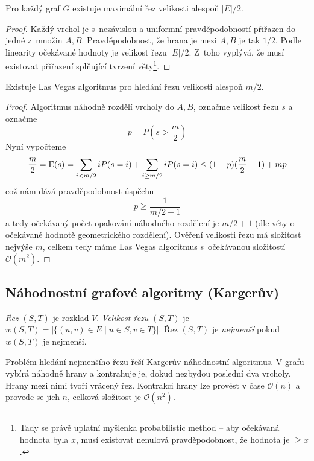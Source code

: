 \begin{theorem}
    Pro každý graf $G$ existuje maximální řez velikosti alespoň
    $\lvert E \rvert / 2$.
\end{theorem}

\begin{proof}
    Každý vrchol je s~nezávislou a uniformní pravděpodobností přiřazen
    do jedné z~množin $A, B$. Pravděpodobnost, že hrana je mezi $A, B$
    je tak $1/2$. Podle linearity očekávané hodnoty je velikost řezu
    $\lvert E \rvert / 2$. Z~toho vyplývá, že musí existovat přiřazení
    splňující tvrzení věty\footnote{Tady se právě uplatní myšlenka
    probabilistic method -- aby očekávaná hodnota byla $x$, musí
    existovat nenulová pravděpodobnost, že hodnota je $\geq x$.}.
\end{proof}

\begin{theorem}
    Existuje Las Vegas algoritmus pro hledání řezu velikosti alespoň
    $m/2$.
\end{theorem}

\begin{proof}
    Algoritmus náhodně rozdělí vrcholy do $A, B$, označme velikost řezu
    $s$ a označme
    \[
    p = P(s > \frac{m}{2})
    \]
    Nyní vypočteme
    \[
        \frac{m}{2}
        = \operatorname{E}(s)
        = \sum_{i < m/2} i P(s = i)
        + \sum_{i \geq m/2} i P(s = i)
        \leq (1-p)(\frac{m}{2} - 1) + mp
    \]
    což nám dává pravděpodobnost úspěchu
    \[
        p \geq \frac{1}{m/2 + 1}
    \]
    a tedy očekávaný počet opakování náhodného rozdělení je $m/2 + 1$
    (dle věty o očekávané hodnotě geometrického rozdělení).
    Ověření velikosti řezu má složitost nejvýše $m$, celkem tedy máme
    Las Vegas algoritmus s~očekávanou složitostí $\mathcal{O}(m^2)$.
\end{proof}

\subsection{Náhodnostní grafové algoritmy (Kargerův)}

\begin{definition}
    {\em Řez} $(S,T)$ je rozklad $V$.
    {\em Velikost řezu} $(S,T)$ je
    $w(S,T) = \lvert \{ (u,v) \in E \mid u \in S, v \in T \} \rvert$.
    Řez $(S,T)$ je {\em nejmenší} pokud $w(S,T)$ je nejmenší.
\end{definition}

Problém hledání nejmenšího řezu řeší Kargerův náhodnostní algoritmus.
V grafu vybírá náhodně hrany a kontrahuje je, dokud nezbydou poslední
dva vrcholy. Hrany mezi nimi tvoří vrácený řez.
Kontrakci hrany lze provést v čase $\mathcal{O}(n)$ a provede se jich
$n$, celková složitost je $\mathcal{O}(n^2)$.

